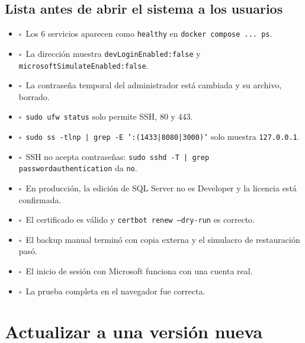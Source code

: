 \documentclass[11pt,a4paper,oneside]{report}
\newcommand{\cod}[1]{\texttt{\small #1}}
\newcommand{\casilla}{$\square$\ }
\begin{document}
\section{Lista antes de abrir el sistema a los usuarios}
\begin{itemize}[label={}]
  \item \casilla Los 6 servicios aparecen como \cod{healthy} en \cod{docker compose ... ps}.
  \item \casilla La dirección  muestra \cod{devLoginEnabled:false} y \cod{microsoftSimulateEnabled:false}.
  \item \casilla La contraseña temporal del administrador está cambiada y su archivo, borrado.
  \item \casilla \cod{sudo ufw status} solo permite SSH, 80 y 443.
  \item \casilla \cod{sudo ss -tlnp | grep -E ':(1433|8080|3000)'} solo muestra \cod{127.0.0.1}.
  \item \casilla SSH no acepta contraseñas: \cod{sudo sshd -T | grep passwordauthentication} da \cod{no}.
  \item \casilla En producción, la edición de SQL Server no es Developer y la licencia está confirmada.
  \item \casilla El certificado es válido y \cod{certbot renew --dry-run} es correcto.
  \item \casilla El backup manual terminó con copia externa y el simulacro de restauración pasó.
  \item \casilla El inicio de sesión con Microsoft funciona con una cuenta real.
  \item \casilla La prueba completa en el navegador fue correcta.
\end{itemize}

\chapter{Actualizar a una versión nueva}\label{cap:actualizar}
\end{document}
